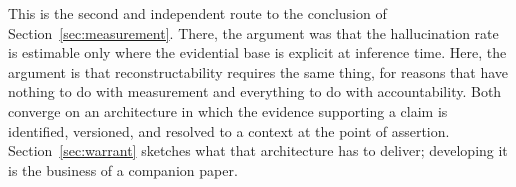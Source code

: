 This is the second and independent route to the conclusion of
Section~\ref{sec:measurement}. There, the argument was that the hallucination
rate is estimable only where the evidential base is explicit at inference time.
Here, the argument is that reconstructability requires the same thing, for
reasons that have nothing to do with measurement and everything to do with
accountability. Both converge on an architecture in which the evidence supporting
a claim is identified, versioned, and resolved to a context at the point of
assertion. Section~\ref{sec:warrant} sketches what that architecture has to
deliver; developing it is the business of a companion paper.
